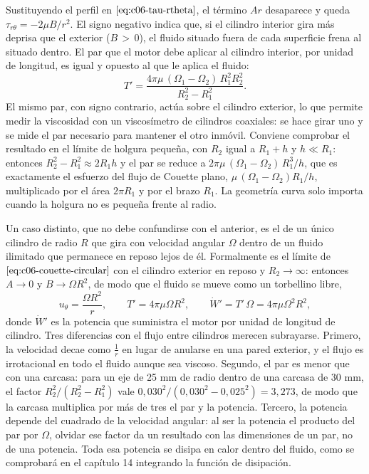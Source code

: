 \documentclass[10pt,openany]{book}
\begin{document}
Sustituyendo el perfil en \(\eqref{eq:c06-tau-rtheta}\), el término \(A r\) desaparece y queda \(\tau_{r\theta} = -2\mu B/r^{2}\). El signo negativo indica que, si el cilindro interior gira más deprisa que el exterior (\(B\,>\,0\)), el fluido situado fuera de cada superficie frena al situado dentro. El par que el motor debe aplicar al cilindro interior, por unidad de longitud, es igual y opuesto al que le aplica el fluido:
\begin{equation}
T' = \frac{4\pi\mu\,(\Omega_1 - \Omega_2)\,R_1^{2} R_2^{2}}{R_2^{2} - R_1^{2}}. \label{eq:c06-par-circular}
\end{equation}
El mismo par, con signo contrario, actúa sobre el cilindro exterior, lo que permite medir la viscosidad con un viscosímetro de cilindros coaxiales: se hace girar uno y se mide el par necesario para mantener el otro inmóvil. Conviene comprobar el resultado en el límite de holgura pequeña, con \(R_2\) igual a \(R_1 + h\) y \(h \ll R_1\): entonces \(R_2^{2} - R_1^{2} \approx 2R_1 h\) y el par se reduce a \(2\pi\mu\,(\Omega_1 - \Omega_2)\,R_1^{3}/h\), que es exactamente el esfuerzo del flujo de Couette plano, \(\mu\,(\Omega_1 - \Omega_2)R_1/h\), multiplicado por el área \(2\pi R_1\) y por el brazo \(R_1\). La geometría curva solo importa cuando la holgura no es pequeña frente al radio.

Un caso distinto, que no debe confundirse con el anterior, es el de un único cilindro de radio \(R\) que gira con velocidad angular \(\Omega\) dentro de un fluido ilimitado que permanece en reposo lejos de él. Formalmente es el límite de \(\eqref{eq:c06-couette-circular}\) con el cilindro exterior en reposo y \(R_2 \to \infty\): entonces \(A \to 0\) y \(B \to \Omega R^{2}\), de modo que el fluido se mueve como un torbellino libre,
\begin{equation}
u_\theta = \frac{\Omega R^{2}}{r},\qquad T' = 4\pi\mu\Omega R^{2},\qquad \dot W' = T'\,\Omega = 4\pi\mu\Omega^{2}R^{2}, \label{eq:c06-cilindro-aislado}
\end{equation}
donde \(\dot W'\) es la potencia que suministra el motor por unidad de longitud de cilindro. Tres diferencias con el flujo entre cilindros merecen subrayarse. Primero, la velocidad decae como \(\tfrac{1}{r}\) en lugar de anularse en una pared exterior, y el flujo es irrotacional en todo el fluido aunque sea viscoso. Segundo, el par es menor que con una carcasa: para un eje de 25 mm de radio dentro de una carcasa de 30 mm, el factor \(R_2^{2}/(R_2^{2} - R_1^{2})\) vale \(0{,}030^2/(0{,}030^2 - 0{,}025^2) = 3{,}273\), de modo que la carcasa multiplica por más de tres el par y la potencia. Tercero, la potencia depende del cuadrado de la velocidad angular: al ser la potencia el producto del par por \(\Omega\), olvidar ese factor da un resultado con las dimensiones de un par, no de una potencia. Toda esa potencia se disipa en calor dentro del fluido, como se comprobará en el capítulo 14 integrando la función de disipación.
\end{document}
